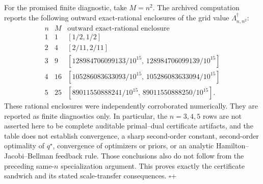 For the promised finite diagnostic, take \(M=n^2\).  The archived computation reports the following outward exact-rational enclosures of the grid value \(\Lambda_{n,n^2}^\dagger\):
\[
\begin{array}{c|c|c}
n&M&\text{outward exact-rational enclosure}\\ \hline
1&1&[1/2,1/2]\\
2&4&[2/11,2/11]\\
3&9&[128984706099133/10^{15},\,128984706099139/10^{15}]\\
4&16&[105286083633093/10^{15},\,105286083633094/10^{15}]\\
5&25&[89011550888241/10^{15},\,89011550888250/10^{15}].
\end{array}
\]
These rational enclosures were independently corroborated numerically.  They are reported as finite diagnostics only.  In particular, the \(n=3,4,5\) rows are not asserted here to be complete auditable primal--dual certificate artifacts, and the table does not establish convergence, a sharp second-order constant, second-order optimality of \(q^\star\), convergence of optimizers or priors, or an analytic Hamilton--Jacobi--Bellman feedback rule.  Those conclusions also do not follow from the preceding same-\(n\) specialization argument.  This proves exactly the certificate sandwich and its stated scale-transfer consequences. \(\square\)+